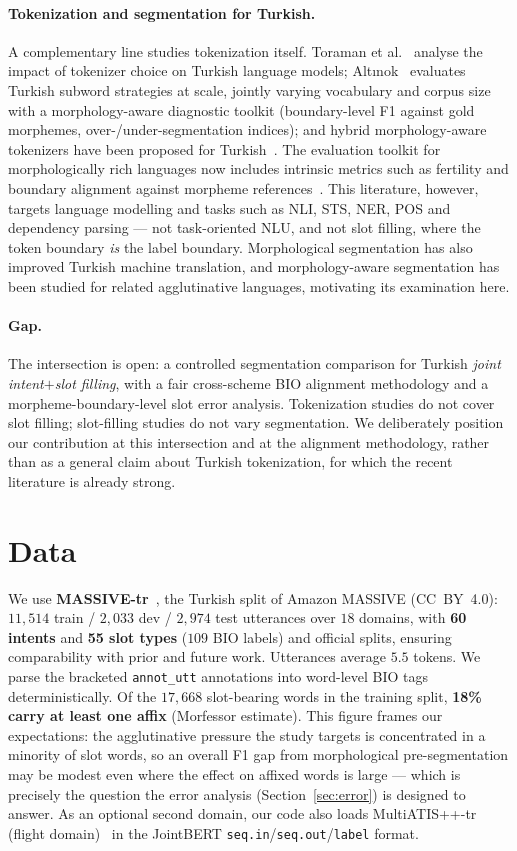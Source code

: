 \documentclass[runningheads]{llncs}
\begin{document}
\paragraph{Tokenization and segmentation for Turkish.}
A complementary line studies tokenization itself. Toraman et
al.~\cite{toraman2022} analyse the impact of tokenizer choice on Turkish language
models; Altınok~\cite{altinok2026} evaluates Turkish subword strategies at scale,
jointly varying vocabulary and corpus size with a morphology-aware diagnostic
toolkit (boundary-level F1 against gold morphemes, over-/under-segmentation
indices); and hybrid morphology-aware tokenizers have been proposed for
Turkish~\cite{tokenswithmeaning2025}. The evaluation toolkit for morphologically
rich languages now includes intrinsic metrics such as fertility and boundary
alignment against morpheme references~\cite{tokalign70}. This literature, however, targets language
modelling and tasks such as NLI, STS, NER, POS and dependency parsing --- not
task-oriented NLU, and not slot filling, where the token boundary \emph{is} the
label boundary. Morphological segmentation has also improved Turkish machine
translation, and morphology-aware segmentation has been studied for related
agglutinative languages, motivating its examination here.

\paragraph{Gap.}
The intersection is open: a controlled segmentation comparison for Turkish
\emph{joint intent$+$slot filling}, with a fair cross-scheme BIO alignment
methodology and a morpheme-boundary-level slot error analysis. Tokenization
studies do not cover slot filling; slot-filling studies do not vary segmentation.
We deliberately position our contribution at this intersection and at the
alignment methodology, rather than as a general claim about Turkish tokenization,
for which the recent literature is already strong.

\section{Data}
We use \textbf{MASSIVE-tr}~\cite{fitzgerald2022massive}, the Turkish split of
Amazon MASSIVE (CC~BY~4.0): $11{,}514$ train / $2{,}033$ dev / $2{,}974$ test
utterances over $18$ domains, with \textbf{60 intents} and \textbf{55 slot
types} ($109$ BIO labels) and official splits, ensuring comparability with prior
and future work. Utterances average $5.5$ tokens. We parse the bracketed
\texttt{annot\_utt} annotations into word-level BIO tags deterministically. Of
the $17{,}668$ slot-bearing words in the training split, \textbf{18\% carry at
least one affix} (Morfessor estimate). This figure frames our expectations: the
agglutinative pressure the study targets is concentrated in a minority of slot
words, so an overall F1 gap from morphological pre-segmentation may be modest
even where the effect on affixed words is large --- which is precisely the
question the error analysis (Section~\ref{sec:error}) is designed to answer.
As an optional second domain, our code also loads MultiATIS++-tr (flight
domain)~\cite{xu2020multiatis} in the JointBERT
\texttt{seq.in}/\texttt{seq.out}/\texttt{label} format.
\end{document}
